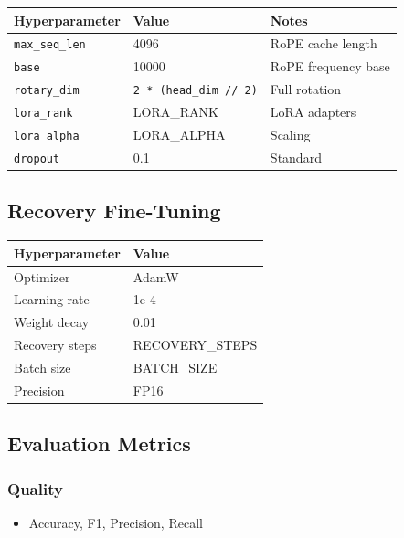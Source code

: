 \begin{table}[H]
\centering
\small
\begin{tabular}{lll}
\toprule
\textbf{Hyperparameter} & \textbf{Value} & \textbf{Notes} \\
\midrule
\texttt{max\_seq\_len} & 4096 & RoPE cache length \\
\texttt{base} & 10000 & RoPE frequency base \\
\texttt{rotary\_dim} & \texttt{2 * (head\_dim // 2)} & Full rotation \\
\texttt{lora\_rank} & {{LORA\_RANK}} & LoRA adapters \\
\texttt{lora\_alpha} & {{LORA\_ALPHA}} & Scaling \\
\texttt{dropout} & 0.1 & Standard \\
\bottomrule
\end{tabular}
\end{table}

\subsection{Recovery Fine-Tuning}

\begin{table}[H]
\centering
\small
\begin{tabular}{ll}
\toprule
\textbf{Hyperparameter} & \textbf{Value} \\
\midrule
Optimizer & AdamW \\
Learning rate & 1e-4 \\
Weight decay & 0.01 \\
Recovery steps & {{RECOVERY\_STEPS}} \\
Batch size & {{BATCH\_SIZE}} \\
Precision & FP16 \\
\bottomrule
\end{tabular}
\end{table}

\subsection{Evaluation Metrics}

\subsubsection{Quality}
\begin{itemize}
\item Accuracy, F1, Precision, Recall

\end{itemize}

